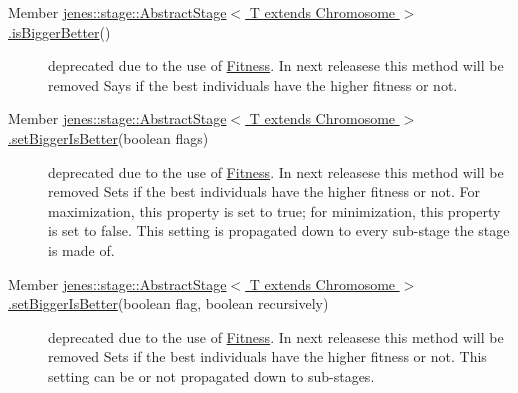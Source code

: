 \label{deprecated__deprecated000001}
\hypertarget{deprecated__deprecated000001}{}
 \begin{description}
\item[Member \hyperlink{classjenes_1_1stage_1_1_abstract_stage_3_01_t_01extends_01_chromosome_01_4_c20363682ebc9214d9253ff157a06a2d}{jenes::stage::AbstractStage$<$ T extends Chromosome $>$.isBiggerBetter}() ]deprecated due to the use of \hyperlink{}{Fitness}. In next releasese this method will be removed Says if the best individuals have the higher fitness or not.

\end{description}


\label{deprecated__deprecated000002}
\hypertarget{deprecated__deprecated000002}{}
 \begin{description}
\item[Member \hyperlink{classjenes_1_1stage_1_1_abstract_stage_3_01_t_01extends_01_chromosome_01_4_dfddd6664c7f9f2eeba94d59de6fcebf}{jenes::stage::AbstractStage$<$ T extends Chromosome $>$.setBiggerIsBetter}(boolean flags) ]deprecated due to the use of \hyperlink{}{Fitness}. In next releasese this method will be removed Sets if the best individuals have the higher fitness or not. For maximization, this property is set to true; for minimization, this property is set to false. This setting is propagated down to every sub-stage the stage is made of.

\end{description}


\label{deprecated__deprecated000003}
\hypertarget{deprecated__deprecated000003}{}
 \begin{description}
\item[Member \hyperlink{classjenes_1_1stage_1_1_abstract_stage_3_01_t_01extends_01_chromosome_01_4_003250025de6f005e247a05b107e5e8f}{jenes::stage::AbstractStage$<$ T extends Chromosome $>$.setBiggerIsBetter}(boolean flag, boolean recursively) ]deprecated due to the use of \hyperlink{}{Fitness}. In next releasese this method will be removed Sets if the best individuals have the higher fitness or not. This setting can be or not propagated down to sub-stages.

\end{description}
